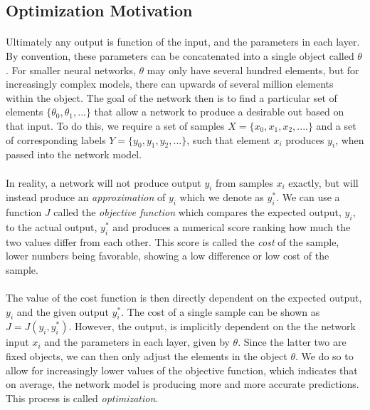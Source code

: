 \documentclass[12pt,letterpaper]{article}
\begin{document}
\subsection{Optimization Motivation}

\paragraph*{}Ultimately any output is function of the input, and the parameters in each layer. By convention, these parameters can be concatenated into a single object called $\theta$. For smaller neural networks, $\theta$ may only have several hundred elements, but for increasingly complex models, there can upwards of several million elements within the object. The goal of the network then is to find a particular set of elements $\{ \theta_0 , \theta_1 , ... \}$ that allow a network to produce a desirable out based on that input. To do this, we require a set of samples $X = \{x_0,x_1,x_2,....\}$ and a set of corresponding labels 
$Y = \{y_0,y_1,y_2,...\}$, such that element $x_i$ produces $y_i$, when passed into the network model. 

\paragraph*{}In reality, a network will not produce output $y_i$ from samples $x_i$ exactly, but will instead produce an \textit{approximation} of $y_i$ which we denote as $y_i^*$. We can use a function $J$ called the \textit{objective function} which compares the expected output, $y_i$, to the actual output, $y_i^*$ and produces a numerical score ranking how much the two values differ from each other. This score is called the \textit{cost} of the sample, lower numbers being favorable, showing a low difference or low cost of the sample.

\paragraph*{}The value of the cost function is then directly dependent on the expected output, $y_i$ and the given output $y_i^*$. The cost of a single sample can be shown as $J = J( y_i , y_i^* )$. However, the output, is implicitly dependent on the the network input $x_i$ and the parameters in each layer, given by $\theta$. Since the latter two are fixed objects, we can then only adjust the elements in the object $\theta$. We do so to allow for increasingly lower values of the objective function, which indicates that on average, the network model is producing more and more accurate predictions. This process is called \textit{optimization}. 











\end{document}
